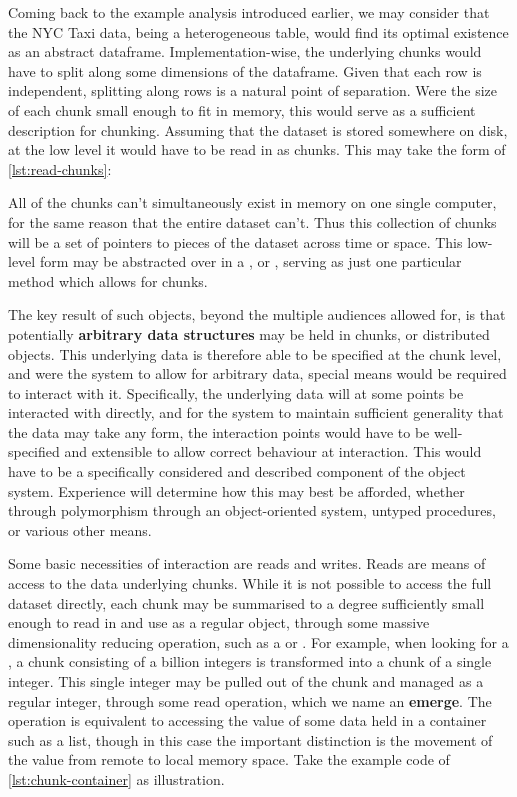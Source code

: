 Coming back to the example analysis introduced earlier, we may consider that the NYC Taxi data, being a heterogeneous table, would find its optimal existence as an abstract dataframe.
Implementation-wise, the underlying chunks would have to split along some dimensions of the dataframe.
Given that each row is independent, splitting along rows is a natural point of separation.
Were the size of each chunk small enough to fit in memory, this would serve as a sufficient description for chunking.
Assuming that the dataset is stored somewhere on disk, at the low level it would have to be read in as chunks.
This may take the form of \cref{lst:read-chunks}:


All of the chunks can't simultaneously exist in memory on one single computer, for the same reason that the entire dataset can't.
Thus this collection of chunks will be a set of pointers to pieces of the dataset across time or space.
This low-level form may be abstracted over in a , or , serving as just one particular method which allows for chunks.

The key result of such objects, beyond the multiple audiences allowed for, is that potentially \textbf{arbitrary data structures} may be held in chunks, or distributed objects.
This underlying data is therefore able to be specified at the chunk level, and were the system to allow for arbitrary data, special means would be required to interact with it.
Specifically, the underlying data will at some points be interacted with directly, and for the system to maintain sufficient generality that the data may take any form, the interaction points would have to be well-specified and extensible to allow correct behaviour at interaction.
This would have to be a specifically considered and described component of the object system.
Experience will determine how this may best be afforded, whether through polymorphism through an object-oriented system, untyped procedures, or various other means.

Some basic necessities of interaction are reads and writes.
Reads are means of access to the data underlying chunks.
While it is not possible to access the full dataset directly, each chunk may be summarised to a degree sufficiently small enough to read in and use as a regular object, through some massive dimensionality reducing operation, such as a  or .
For example, when looking for a , a chunk consisting of a billion integers is transformed into a chunk of a single integer.
This single integer may be pulled out of the chunk and managed as a regular integer, through some read operation, which we name an \textbf{emerge}.
The operation is equivalent to accessing the value of some data held in a container such as a list, though in this case the important distinction is the movement of the value from remote to local memory space.
Take the example code of \cref{lst:chunk-container} as illustration.

